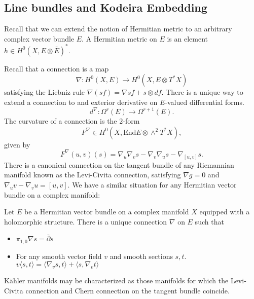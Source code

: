 \subsection{Line bundles and Kodeira Embedding}
Recall that we can extend the notion of Hermitian metric to an arbitrary complex vector bundle \(E\). A Hermitian metric on \(E\) is an element \(h \in H^0(X, E \otimes \bar{E})^* \).

Recall that a connection is a map
\[
\nabla: H^0(X,E) \to H^0(X,E \otimes T^* X)
\]
satisfying the Liebniz rule \(\nabla(s f) = \nabla s f + s \otimes df\). There is a unique way to extend a connection to and exterior derivative on \(E\)-valued differential forms.
\[
d^\nabla: \Omega^r(E) \to \Omega^{r+1}(E).
\]
The curvature of a connection is the \(2\)-form
\[
F^\nabla \in H^0(X, \text{End}  E \otimes \wedge^2 T^* X),
\]
given by
\[
F^\nabla(u,v)(s) = \nabla_u \nabla_v s - \nabla_v \nabla_u s - \nabla_{[u,v]} s.
\]
There is a canonical connection on the tangent bundle of any Riemannian manifold known as the Levi-Civita connection, satisfying \(\nabla g = 0\) and \(\nabla_u v - \nabla_v u = [u,v]\). We have a similar situation for any Hermitian vector bundle on a complex manifold:	
\begin{example}
Let \(E\) be a Hermitian vector bundle on a complex manifold \(X\) equipped with a holomorphic structure. There is a unique connection \(\nabla\) on \(E\) such that 
\begin{itemize}
\item  \(\pi_{1,0} \nabla s = \bar{\partial} s\)
\item For any smooth vector field \(v\) and smooth sections \(s,t\). \(v \langle s,t \rangle = \langle \nabla_v s , t \rangle + \langle s, \nabla_v t \rangle\) 
\end{itemize}
\end{example}
K\"ahler manifolds may be characterized as those manifolds for which the Levi-Civita connection and Chern connection on the tangent bundle coincide.

